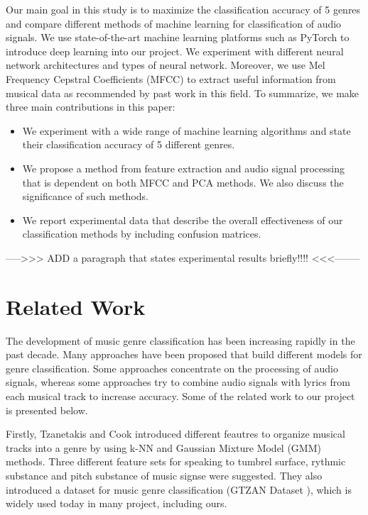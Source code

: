 Our main goal in this study is to maximize the classification accuracy of 5 genres and compare different methods of machine learning for classification of audio signals. We use state-of-the-art machine learning platforms such as PyTorch \cite{PyTorch:2017} to introduce deep learning into our project. We experiment with different neural network architectures and types of neural network. Moreover, we use Mel Frequency Cepstral Coefficients (MFCC) \cite{MFCC:2011} to extract useful information from musical data as recommended by past work in this field.
To summarize, we make three main contributions in this paper:
\begin{itemize}
  \item We experiment with a wide range of machine learning algorithms and state their classification accuracy of 5 different genres. 
  \item We propose a method from feature extraction and audio signal processing that is dependent on both MFCC and PCA methods. We also discuss the significance of such methods. 
  \item We report experimental data that describe the overall effectiveness of our classification methods by including confusion matrices. 
\end{itemize}

----->>> ADD a paragraph that states experimental results briefly!!!! <<<-------- 

\section{Related Work}\label{sec:related}

The development of music genre classification has been increasing rapidly in the past decade. Many approaches have been proposed that build different models for genre classification. Some approaches concentrate on the processing of audio signals, whereas some approaches try to combine audio signals with lyrics from each musical track to increase accuracy. Some of the related work to our project is presented below. 

Firstly, Tzanetakis and Cook \cite{GTZAN:2002} introduced different feautres to organize musical tracks into a genre by using k-NN and Gaussian Mixture Model (GMM) methods. Three different feature sets for speaking to tumbrel surface, rythmic substance and pitch substance of music signse were suggested. They also introduced a dataset for music genre classification (GTZAN Dataset \cite{GTZAN:2002}), which is widely used today in many project, including ours. 

